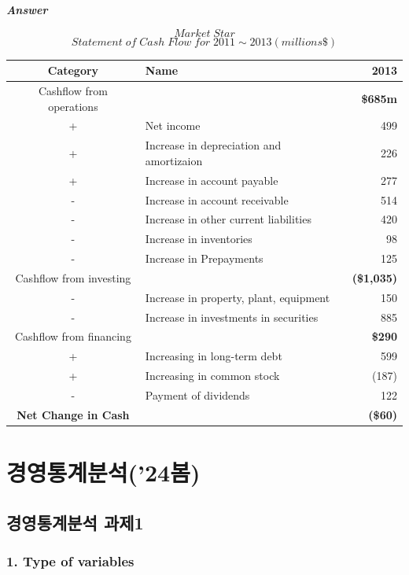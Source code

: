 \documentclass[
  letterpaper,
  DIV=11,
  numbers=noendperiod]{scrreprt}
\begin{document}
\textbf{\emph{Answer}}

\[Market\;Star\]
\[Statement\;of\;Cash\;Flow\;for\;2011\sim 2013(millions\$)\]

\begin{longtable}[]{@{}clr@{}}
\toprule\noalign{}
Category & Name & 2013 \\
\midrule\noalign{}
\endhead
\bottomrule\noalign{}
\endlastfoot
Cashflow from operations & & \textbf{\$685m} \\
+ & Net income & 499 \\
+ & Increase in depreciation and amortizaion & 226 \\
+ & Increase in account payable & 277 \\
- & Increase in account receivable & 514 \\
- & Increase in other current liabilities & 420 \\
- & Increase in inventories & 98 \\
- & Increase in Prepayments & 125 \\
Cashflow from investing & & \textbf{(\$1,035)} \\
- & Increase in property, plant, equipment & 150 \\
- & Increase in investments in securities & 885 \\
Cashflow from financing & & \textbf{\$290} \\
+ & Increasing in long-term debt & 599 \\
+ & Increasing in common stock & (187) \\
- & Payment of dividends & 122 \\
\textbf{Net Change in Cash} & & \textbf{(\$60)} \\
\end{longtable}

\part{경영통계분석('24봄)}

\chapter*{경영통계분석
과제1}\label{uxacbduxc601uxd1b5uxacc4uxbd84uxc11d-uxacfcuxc81c1}


\section*{1. Type of variables}\label{type-of-variables}
\end{document}

